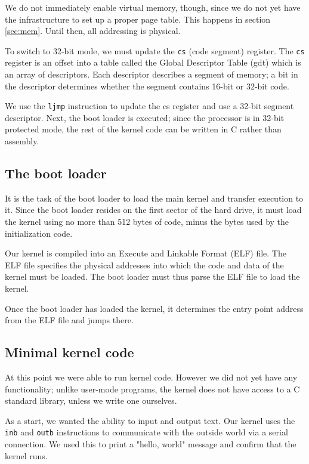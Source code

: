 \documentclass{article}
\begin{document}
We do not immediately enable virtual memory, though, since we do not yet have
the infrastructure to set up a proper page table. This happens in section
\ref{sec:mem}. Until then, all addressing is physical.

To switch to 32-bit mode, we must update the \texttt{cs} (code segment)
register. The \texttt{cs} register is an offset into a table called the Global
Descriptor Table (\gls{gdt}) which is an array of descriptors. Each descriptor
describes a segment of memory; a bit in the descriptor determines whether the
segment contains 16-bit or 32-bit code. 

We use the \texttt{ljmp} instruction to update the \gls{cs} register and use a
32-bit segment descriptor. Next, the boot loader is executed; since the
processor is in 32-bit protected mode, the rest of the kernel code can be
written in C rather than assembly.




\subsection{The boot loader}
It is the task of the boot loader to load the main kernel and transfer
execution to it. Since the boot loader resides on the first sector of the hard
drive, it must load the kernel using no more than 512 bytes of code, minus the
bytes used by the initialization code.

Our kernel is compiled into an Execute and Linkable Format (ELF) file. The ELF
file specifies the physical addresses into which the code and data of the
kernel must be loaded. The boot loader must thus parse the ELF file to load
the kernel.

Once the boot loader has loaded the kernel, it determines the entry point
address from the ELF file and jumps there.


\subsection{Minimal kernel code}
At this point we were able to run kernel code. However we did not yet have any
functionality; unlike user-mode programs, the kernel does not have access to a
C standard library, unless we write one ourselves.

As a start, we wanted the ability to input and output text.
Our kernel uses the \texttt{inb} and \texttt{outb} instructions to
communicate with the outside world via a serial connection. We used this to
print a "hello, world" message and confirm that the kernel runs.
\end{document}
